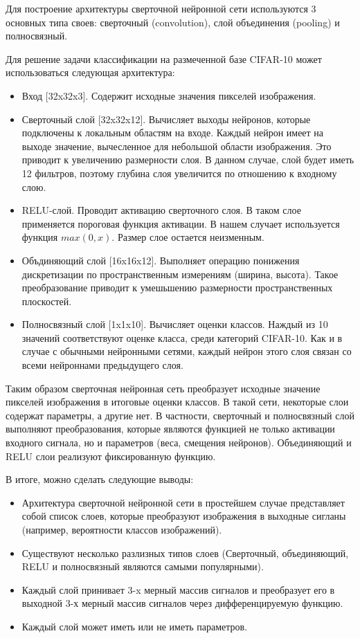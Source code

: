 \documentclass[a4paper,english,russian]{G2-105}
\begin{document}
\par Для построение архитектуры сверточной нейронной сети используются 3 основных типа своев: сверточный (convolution), слой объединения (pooling) и полносвязный. 
\par Для решение задачи классификации на размеченной базе CIFAR-10 может использоваться следующая архитектура:
\begin{itemize}
\item Вход [32x32x3]. Содержит исходные значения пикселей изображения.
\item Сверточный слой [32x32x12]. Вычисляет выходы нейронов, которые подключены к локальным областям на входе. Каждый нейрон имеет на выходе значение, вычесленное для небольшой области изображения. Это приводит к увеличению размерности слоя. В данном случае, слой будет иметь 12 фильтров, поэтому глубина слоя увеличится по отношению к входному слою.
\item RELU-слой. Проводит активацию сверточного слоя. В таком слое применяется пороговая функция активации. В нашем случает используется функция $max(0, x)$. Размер слое остается неизменным.
\item Объдиняющий слой [16x16x12]. Выполняет операцию понижения дискретизации по пространственным измерениям (ширина, высота). Такое преобразование приводит к умешьшению размерности пространственных плоскостей.
\item Полносвязный слой [1x1x10]. Вычисляет оценки классов. Наждый из 10 значений соответствуют оценке класса, среди категорий CIFAR-10. Как и в случае с обычными нейронными сетями, каждый нейрон этого слоя связан со всеми нейроннами предыдущего слоя.
\end{itemize}
\par Таким образом сверточная нейронная сеть преобразует исходные значение пикселей изображения в итоговые оценки классов. В такой сети, некоторые слои содержат параметры, а другие нет. В частности, сверточный и полносвязный слой выполняют преобразования, которые являются функцией не только активации входного сигнала, но и параметров (веса, смещения нейронов). Объединяющий и RELU слои реализуют фиксированную функцию. 
\par В итоге, можно сделать следующие выводы:
\begin{itemize}
\item Архитектура сверточной нейронной сети в простейшем случае представляет собой список слоев, которые преобразуют изображения в выходные сигланы (например, вероятности классов изображений).
\item Существуют несколько разлизных типов слоев (Сверточный, объединяющий, RELU и полносвязный являются самыми популярными).
\item Каждый слой принивает 3-x мерный массив сигналов и преобразует его в выходной 3-х мерный массив сигналов через дифференцируемую функцию.
\item Каждый слой может иметь или не иметь параметров.
\end{itemize}
\end{document}
